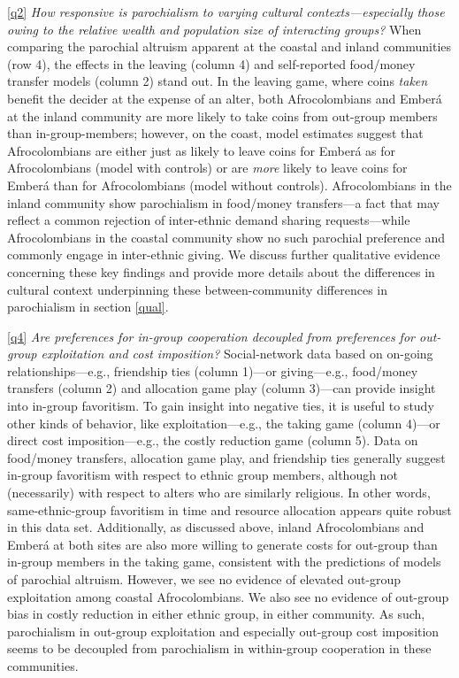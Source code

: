 \documentclass[bibauthoryear]{aa}
\begin{document}
\ref{q2} \emph{How responsive is parochialism to varying cultural contexts---especially those owing to the relative wealth and population size of interacting groups?} When comparing the parochial altruism apparent at the coastal and inland communities (row 4), the effects in the leaving (column 4) and self-reported food/money transfer models (column 2) stand out. In the leaving game, where coins \textit{taken} benefit the decider at the expense of an alter, both Afrocolombians and Ember\'a at the inland community are more likely to take coins from out-group members than in-group-members; however, on the coast, model estimates suggest that Afrocolombians are either just as likely to leave coins for Ember\'a  as for Afrocolombians (model with controls) or are \textit{more} likely to leave coins for Ember\'a than for Afrocolombians (model without controls).  Afrocolombians in the inland community show parochialism in food/money transfers---a fact that may reflect a common \citep[although not universal,][]{Cay73} rejection of inter-ethnic demand sharing requests---while Afrocolombians in the coastal community show no such parochial preference and commonly engage in inter-ethnic giving.  We discuss further qualitative evidence concerning these key findings and provide more details about the differences in cultural context underpinning these between-community differences in parochialism in section \ref{qual}. 

\ref{q4} \emph{Are preferences for in-group cooperation decoupled from preferences for out-group exploitation and cost imposition?} Social-network data based on on-going relationships---e.g., friendship ties (column 1)---or giving---e.g., food/money transfers (column 2) and allocation game play (column 3)---can provide insight into in-group favoritism. To gain insight into negative ties, it is useful to study other kinds of behavior, like exploitation---e.g., the taking game (column 4)---or direct cost imposition---e.g., the costly reduction game (column 5). Data on food/money transfers, allocation game play, and friendship ties generally suggest in-group favoritism with respect to ethnic group members, although not (necessarily) with respect to alters who are similarly religious. %
In other words, same-ethnic-group favoritism in time and resource allocation appears quite robust in this data set. Additionally, as discussed above,  inland Afrocolombians and Ember\'a at both sites are also more willing to generate costs for out-group than in-group members in the taking game, consistent with the predictions of models of parochial altruism.  However, we see no evidence of elevated out-group exploitation among coastal Afrocolombians. We also see no evidence of out-group bias in costly reduction in either ethnic group, in either community. As such, parochialism in out-group exploitation and especially out-group cost imposition seems to  be decoupled from parochialism in within-group cooperation in these communities.
\end{document}
